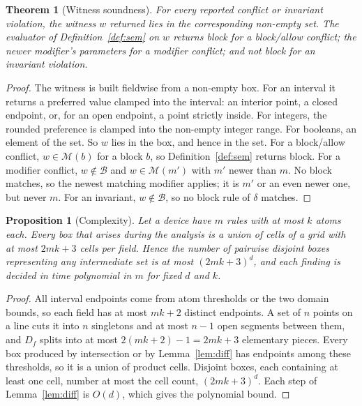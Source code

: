 \documentclass[conference]{IEEEtran}
\newtheorem{theorem}{Theorem}
\newtheorem{proposition}{Proposition}
\theoremstyle{definition}
\newcommand{\M}{\mathcal{M}}
\begin{document}
\begin{theorem}[Witness soundness]\label{thm:witness}
For every reported conflict or invariant violation, the witness $w$ returned lies in the corresponding non-empty set. The evaluator of Definition~\ref{def:sem} on $w$ returns \emph{block} for a block/allow conflict; the newer modifier's parameters for a modifier conflict; and not \emph{block} for an invariant violation.
\end{theorem}
\begin{proof}
The witness is built fieldwise from a non-empty box. For an interval it returns a preferred value clamped into the interval: an interior point, a closed endpoint, or, for an open endpoint, a point strictly inside. For integers, the rounded preference is clamped into the non-empty integer range. For booleans, an element of the set. So $w$ lies in the box, and hence in the set. For a block/allow conflict, $w\in\M(b)$ for a block $b$, so Definition~\ref{def:sem} returns block. For a modifier conflict, $w\notin\mathcal B$ and $w\in\M(m')$ with $m'$ newer than $m$. No block matches, so the newest matching modifier applies; it is $m'$ or an even newer one, but never $m$. For an invariant, $w\notin\mathcal B$, so no block rule of $\delta$ matches.
\end{proof}

\begin{proposition}[Complexity]\label{prop:complexity}
Let a device have $m$ rules with at most $k$ atoms each. Every box that arises during the analysis is a union of cells of a grid with at most $2mk+3$ cells per field. Hence the number of pairwise disjoint boxes representing any intermediate set is at most $(2mk+3)^d$, and each finding is decided in time polynomial in $m$ for fixed $d$ and $k$.
\end{proposition}
\begin{proof}
All interval endpoints come from atom thresholds or the two domain bounds, so each field has at most $mk+2$ distinct endpoints. A set of $n$ points on a line cuts it into $n$ singletons and at most $n-1$ open segments between them, and $D_f$ splits into at most $2(mk+2)-1=2mk+3$ elementary pieces. Every box produced by intersection or by Lemma~\ref{lem:diff} has endpoints among these thresholds, so it is a union of product cells. Disjoint boxes, each containing at least one cell, number at most the cell count, $(2mk+3)^d$. Each step of Lemma~\ref{lem:diff} is $O(d)$, which gives the polynomial bound.
\end{proof}
\end{document}
